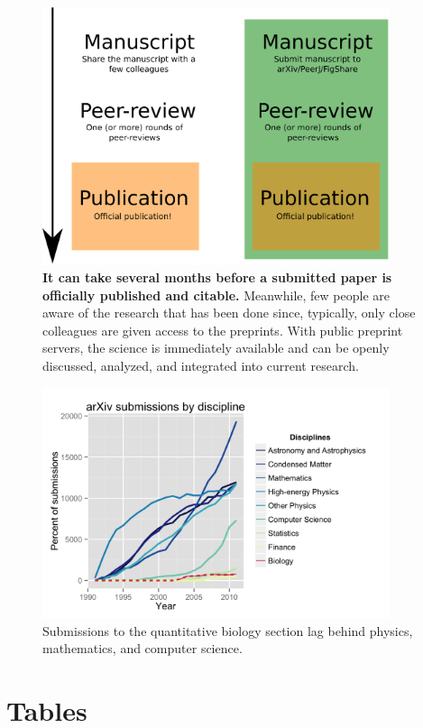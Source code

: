 \documentclass[10pt]{article}
\begin{document}
\begin{figure}[!ht]
\begin{center}
\includegraphics[width=4in]{map.eps}
\end{center}
\caption { {\bf It can take several months before a submitted paper is
officially published and citable.} Meanwhile, few people are aware of the
research that has been done since, typically, only close colleagues are
given access to the preprints. With public preprint servers, the science is
immediately available and can be openly discussed, analyzed, and integrated
into current research. }
\label{fig:map}
\end{figure}

\begin{figure}[!ht]
\begin{center}
\includegraphics[width=4in]{figure_2.png}
\end{center}
\caption { Submissions to the quantitative biology section lag behind
physics, mathematics, and computer science.
}
\label{fig:arxiv}
\end{figure}

\newpage
\section*{Tables}
\end{document}
